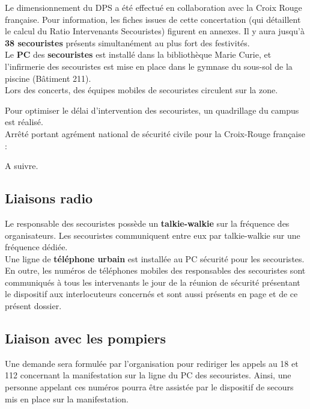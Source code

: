 \documentclass[hidelinks, paper=a4, fontsize=13pt]{report}
\begin{document}
Le dimensionnement du DPS a été effectué en collaboration avec la Croix Rouge française. Pour information, les fiches issues de cette concertation (qui détaillent le calcul du Ratio Intervenants Secouristes) figurent en annexes. Il y aura jusqu’à \textbf{38 secouristes} présents simultanément au plus fort des festivités.\\

Le \textbf{PC} des \textbf{secouristes} est installé dans la bibliothèque Marie Curie, et l’infirmerie des secouristes est mise en place dans le gymnase du sous-sol de la piscine (Bâtiment 211). \\
Lors des concerts, des équipes mobiles de secouristes circulent sur la zone.

Pour optimiser le délai d’intervention des secouristes, un quadrillage du campus est réalisé.\\

Arrêté portant agrément national de sécurité civile pour la Croix-Rouge française :

 A suivre.


\subsection{Liaisons radio}


Le responsable des secouristes possède un \textbf{talkie-walkie} sur la fréquence des organisateurs. Les secouristes communiquent entre eux par talkie-walkie sur une fréquence dédiée.\\

Une ligne de \textbf{téléphone urbain} est installée au PC sécurité pour les secouristes.\\

En outre, les numéros de téléphones mobiles des responsables des secouristes sont communiqués à tous les intervenants le jour de la réunion de sécurité présentant le dispositif aux interlocuteurs concernés et sont aussi présents en page \pageref{refTelPC} et \pageref{refTelOrgas} de ce présent dossier.

\subsection{Liaison avec les pompiers}

Une demande sera formulée par l’organisation pour rediriger les appels au 18 et 112 concernant la manifestation sur la ligne du PC des secouristes. Ainsi, une personne appelant ces numéros pourra être assistée par le dispositif de secours mis en place sur la manifestation.\\
\end{document}
